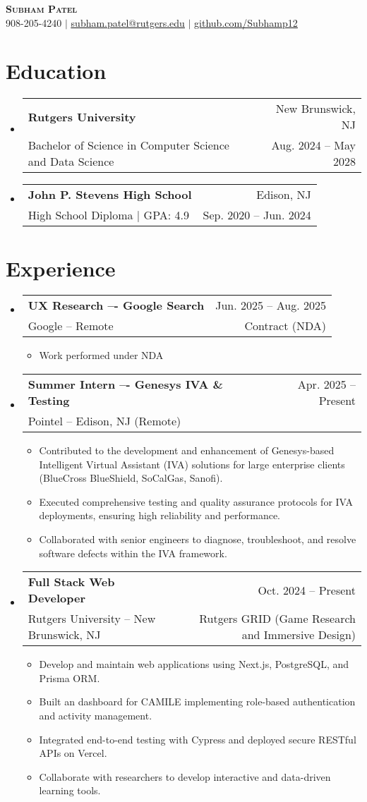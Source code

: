 \documentclass[letterpaper,11pt]{article}
\makeatletter
\newcommand{\resumeItem}[1]{
  \item\small{
    {#1 \vspace{-2pt}}
  }
}
\newcommand{\resumeSubheading}[4]{
  \vspace{-2pt}\item
    \begin{tabular*}{0.97\textwidth}[t]{l@{\extracolsep{\fill}}r}
      \textbf{#1} & #2 \\
      {\small#3} & {\small #4} \\
    \end{tabular*}\vspace{-7pt}
}
\newcommand{\resumeItemListStart}{\begin{itemize}}
\newcommand{\resumeItemListEnd}{\end{itemize}\vspace{-5pt}}
\makeatother
\begin{document}
\begin{center}
    \textbf{\Huge \scshape Subham Patel} \\ \vspace{1pt}
    \small 908-205-4240 $|$ \href{mailto:subham.patel@rutgers.edu}{\underline{subham.patel@rutgers.edu}} $|$ 
    \href{https://github.com/Subhamp12}{\underline{github.com/Subhamp12}}
\end{center}

\section{Education}
  \begin{itemize}[leftmargin=0.15in, label={}]
    \resumeSubheading
      {Rutgers University}{New Brunswick, NJ}
      {Bachelor of Science in Computer Science and Data Science}{Aug. 2024 -- May 2028}
    \resumeSubheading
      {John P. Stevens High School}{Edison, NJ}
      {High School Diploma | GPA: 4.9}{Sep. 2020 -- Jun. 2024}
  \end{itemize}

\section{Experience}
  \begin{itemize}[leftmargin=0.15in, label={}]
    \resumeSubheading
      {UX Research –- Google Search}{Jun. 2025 -- Aug. 2025}
      {Google -- Remote}{Contract (NDA)}
      \resumeItemListStart
        \resumeItem{Work performed under NDA}
      \resumeItemListEnd
    \resumeSubheading
      {Summer Intern –- Genesys IVA \& Testing}{Apr. 2025 -- Present}
      {Pointel -- Edison, NJ (Remote)}{}
      \resumeItemListStart
        \resumeItem{Contributed to the development and enhancement of Genesys-based Intelligent Virtual Assistant (IVA) solutions for large enterprise clients (BlueCross BlueShield, SoCalGas, Sanofi).}
        \resumeItem{Executed comprehensive testing and quality assurance protocols for IVA deployments, ensuring high reliability and performance.}
        \resumeItem{Collaborated with senior engineers to diagnose, troubleshoot, and resolve software defects within the IVA framework.}
      \resumeItemListEnd
    \resumeSubheading
      {Full Stack Web Developer}{Oct. 2024 -- Present}
      {Rutgers University -- New Brunswick, NJ}{Rutgers GRID (Game Research and Immersive Design)}
      \resumeItemListStart
        \resumeItem{Develop and maintain web applications using Next.js, PostgreSQL, and Prisma ORM.}
        \resumeItem{Built an dashboard for CAMILE implementing role-based authentication and activity management.}
        \resumeItem{Integrated end-to-end testing with Cypress and deployed secure RESTful APIs on Vercel.}
        \resumeItem{Collaborate with researchers to develop interactive and data-driven learning tools.}
      \resumeItemListEnd
  \end{itemize}
\end{document}
